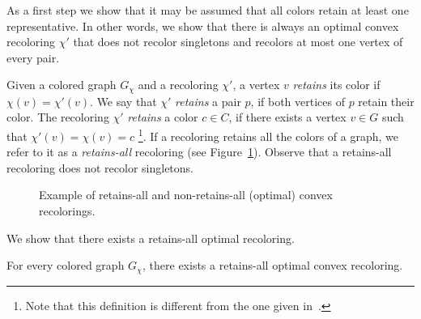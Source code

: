 As a first step we show that it may be assumed that all 
colors retain at least one representative.
%
In other words,
we show that there is always an optimal convex recoloring $\chi'$ 
that does not recolor singletons and recolors at most one vertex of every pair. 

Given a colored graph $G_\chi$ and a recoloring $\chi'$, 
a vertex $v$ \emph{retains} its color if $\chi(v)=\chi'(v)$. 
%
We say that $\chi'$ \emph{retains} a pair $p$, 
if both vertices of $p$ retain their color.  
%
The recoloring $\chi'$ \emph{retains} a color $c \in C$,
if there exists a vertex $v \in G$ such that ${\chi'(v) = \chi(v) = c}$
\footnote{
Note that this definition is different from the one given
in~\cite{kanj2009convex}.
}.
%
If a recoloring retains all the colors of a graph, 
we refer to it as a \emph{retains-all} recoloring (see Figure~\ref{fig:retains-all}).
Observe that a retains-all recoloring does not recolor singletons.

\begin{figure}
\centering

\caption{
\label{fig:retains-all}
Example of retains-all and non-retains-all (optimal) convex recolorings.
}
\end{figure}
%
We show that there exists a retains-all optimal recoloring.

\begin{lemma}
\label{lm:retains-all}
For every colored graph $G_\chi$, 
there exists a retains-all optimal convex recoloring.
\end{lemma}

